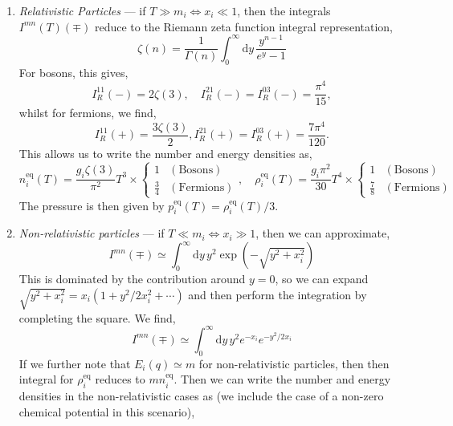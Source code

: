 \documentclass[11pt]{article}
\numberwithin{equation}{section}
\numberwithin{figure}{section}
\numberwithin{table}{section}
\begin{document}
\begin{enumerate}
\item \textit{Relativistic Particles} --- if $T \gg m_i \Leftrightarrow x_i \ll 1$, then the integrals $I^{mn}(T)(\mp)$ reduce to the Riemann zeta function integral representation,
\begin{equation}
\zeta(n) = \frac{1}{\Gamma(n)}\int_{0}^{\infty}{\mathrm{d}y \, \frac{y^{n - 1}}{e^y - 1}}
\end{equation}
For bosons, this gives,
\begin{equation}
I_R^{11}(-) = 2\zeta(3), \quad I_R^{21}(-) = I_R^{03}(-) = \frac{\pi^4}{15},
\end{equation}
whilst for fermions, we find,
\begin{equation}
I_R^{11}(+) = \frac{3\zeta(3)}{2}, I_R^{21}(+) = I_R^{03}(+) = \frac{7\pi^4}{120}.
\end{equation}
This allows us to write the number and energy densities as,
\begin{equation}
n_i^{\mathrm{eq}}(T) = \frac{g_i \zeta(3)}{\pi^2} T^3 \times \begin{cases} 1 & \mathrm{(Bosons)}\\ \frac{3}{4} & \mathrm{(Fermions)}\end{cases}, \quad \rho_i^{\mathrm{eq}}(T) = \frac{g_i \pi^2}{30} T^4 \times \begin{cases} 1 & \mathrm{(Bosons)}\\ \frac{7}{8} & \mathrm{(Fermions)}\end{cases}
\end{equation}
The pressure is then given by $p_i^{\mathrm{eq}}(T) = \rho_i^{\mathrm{eq}}(T)/3$.
\item \textit{Non-relativistic particles} --- if $T \ll m_i \Leftrightarrow x_i \gg 1$, then we can approximate,
\begin{equation}
I^{mn}(\mp) \simeq \int_{0}^{\infty}{\mathrm{d}y \, y^2 \exp\left(-\sqrt{y^2 + x_i^2}\right)}
\end{equation}
This is dominated by the contribution around $y = 0$, so we can expand $\sqrt{y^2 + x_i^2} = x_i(1 + y^2/2x_i^2 + \cdots)$ and then perform the integration by completing the square. We find,
\begin{equation}
I^{mn}(\mp) \simeq \int_0^{\infty}{\mathrm{d}y \, y^2 e^{-x_i}e^{-y^2/2x_i}}
\end{equation}
If we further note that $E_i(q) \simeq m$ for non-relativistic particles, then then integral for $\rho_i^{\mathrm{eq}}$ reduces to $m n_i^{\mathrm{eq}}$. Then we can write the number and energy densities in the non-relativistic cases as (we include the case of a non-zero chemical potential in this scenario),

\end{enumerate}
\end{document}
